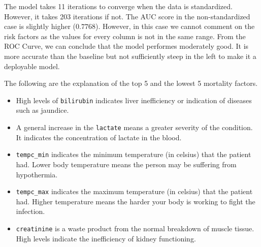 \documentclass[]{article}
\begin{document}
The model takes 11 iterations to converge when the data is standardized. However, it takes 203 iterations if not. The AUC score in the non-standardized case is slightly higher ($0.7768$). However, in this case we cannot comment on the risk factors as the values for every column is not in the same range. From the ROC Curve, we can conclude that the model performes moderately good. It is more accurate than the baseline but not sufficiently steep in the left to make it a deployable model.

The following are the explanation of the top 5 and the lowest 5 mortality factors.
\begin{itemize}
	\item High levels of \texttt{bilirubin} indicates liver inefficiency or indication of diseases such as jaundice.
	\item A general increase in the \texttt{lactate} means a greater severity of the condition. It indicates the concentration of lactate in the blood.
	\item \texttt{tempc\_min} indicates the minimum temperature (in celsius) that the patient had. Lower body temperature means the person may be suffering from hypothermia.
	\item \texttt{tempc\_max} indicates the maximum temperature (in celsius) that the patient had. Higher temperature means the harder your body is working to fight the infection.
	\item \texttt{creatinine} is a waste product from the normal breakdown of muscle tissue. High levels indicate the inefficiency of kidney functioning. 

\end{itemize}
\end{document}
